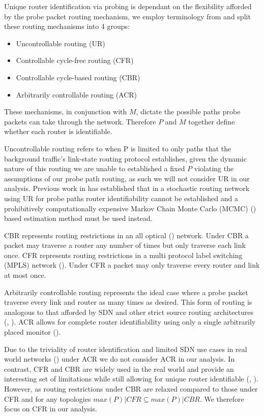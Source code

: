     Unique router identification via probing is dependant on the flexibility afforded by the probe packet routing mechanism, we employ terminology from \cite{he_network_2021} and split these routing mechanisms into 4 groups: \begin{itemize}
        \item Uncontrollable routing (UR)
        \item Controllable cycle-free routing (CFR)
        \item Controllable cycle-based routing (CBR)
        \item Arbitrarily controllable routing (ACR)
    \end{itemize}
    These mechanisms, in conjunction with $M$, dictate the possible paths probe packets can take through the network. Therefore $P$ and $M$ together define whether each router is identifiable.\par
    Uncontrollable routing refers to when P is limited to only paths that the background traffic's link-state routing protocol establishes, given the dynamic nature of this routing we are unable to established a fixed $P$ violating the assumptions of our probe path routing, as such we will not consider UR in our analysis. Previous work in \cite{barnes_stochastic_2020} has established that in a stochastic routing network using UR for probe paths router identifiability cannot be established and a prohibitively computationally expensive Markov Chain Monte Carlo (MCMC) (\cite{dellaportas_bayesian_2002}) based estimation method must be used instead.\par
    
    CBR represents routing restrictions in an all optical (\cite{ahuja_srlg_2011}) network. Under CBR a packet may traverse a router any number of times but only traverse each link once. CFR represents routing restrictions in a multi protocol label switching (MPLS) network (\cite{rosen_multiprotocol_2001}). Under CFR a packet may only traverse every router and link at most once.\par
    Arbitrarily controllable routing represents the ideal case where a probe packet traverse every link and router as many times as desired. This form of routing is analogous to that afforded by SDN and other strict source routing architectures (\cite{university_of_southern_california_darpa_1981}, \cite{open_networking_foundation_openflow_2015}). ACR allows for complete router identifiability using only a single arbitrarily placed monitor (\cite{he_network_2021}).\par
    Due to the triviality of router identification and limited SDN use cases in real world networks (\cite{jarschel_interfaces_2014}) under ACR we do not consider ACR in our analysis. In contrast, CFR and CBR are widely used in the real world and provide an interesting set of limitations while still allowing for unique router identifiable (\cite{ahuja_srlg_2011}, \cite{thomas_ldp_2001}). However, as routing restrictions under CBR are relaxed compared to those under CFR and for any topologies $max(P)|CFR \subseteq max(P)|CBR$. We therefore focus on CFR in our analysis.\par

